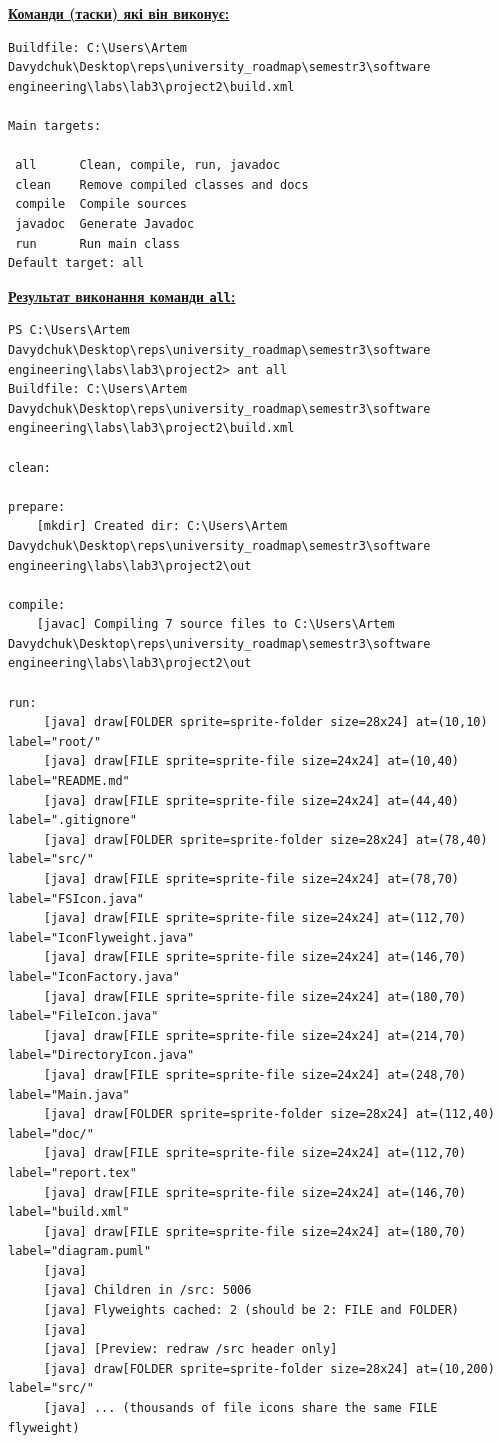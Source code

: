 \documentclass[12pt,a4paper]{article}
\begin{document}
    \newpage

    \textbf{\underline{Команди (таски) які він виконує:}}

    \begin{verbatim}
Buildfile: C:\Users\Artem Davydchuk\Desktop\reps\university_roadmap\semestr3\software engineering\labs\lab3\project2\build.xml

Main targets:

 all      Clean, compile, run, javadoc
 clean    Remove compiled classes and docs
 compile  Compile sources
 javadoc  Generate Javadoc
 run      Run main class
Default target: all
    \end{verbatim}

    \textbf{\underline{Результат виконання команди \texttt{all}:}}

    \begin{verbatim}
PS C:\Users\Artem Davydchuk\Desktop\reps\university_roadmap\semestr3\software engineering\labs\lab3\project2> ant all 
Buildfile: C:\Users\Artem Davydchuk\Desktop\reps\university_roadmap\semestr3\software engineering\labs\lab3\project2\build.xml

clean:

prepare:
    [mkdir] Created dir: C:\Users\Artem Davydchuk\Desktop\reps\university_roadmap\semestr3\software engineering\labs\lab3\project2\out

compile:
    [javac] Compiling 7 source files to C:\Users\Artem Davydchuk\Desktop\reps\university_roadmap\semestr3\software engineering\labs\lab3\project2\out

run:
     [java] draw[FOLDER sprite=sprite-folder size=28x24] at=(10,10) label="root/"
     [java] draw[FILE sprite=sprite-file size=24x24] at=(10,40) label="README.md"
     [java] draw[FILE sprite=sprite-file size=24x24] at=(44,40) label=".gitignore"
     [java] draw[FOLDER sprite=sprite-folder size=28x24] at=(78,40) label="src/"
     [java] draw[FILE sprite=sprite-file size=24x24] at=(78,70) label="FSIcon.java"
     [java] draw[FILE sprite=sprite-file size=24x24] at=(112,70) label="IconFlyweight.java"
     [java] draw[FILE sprite=sprite-file size=24x24] at=(146,70) label="IconFactory.java"
     [java] draw[FILE sprite=sprite-file size=24x24] at=(180,70) label="FileIcon.java"
     [java] draw[FILE sprite=sprite-file size=24x24] at=(214,70) label="DirectoryIcon.java"
     [java] draw[FILE sprite=sprite-file size=24x24] at=(248,70) label="Main.java"
     [java] draw[FOLDER sprite=sprite-folder size=28x24] at=(112,40) label="doc/"
     [java] draw[FILE sprite=sprite-file size=24x24] at=(112,70) label="report.tex"
     [java] draw[FILE sprite=sprite-file size=24x24] at=(146,70) label="build.xml"
     [java] draw[FILE sprite=sprite-file size=24x24] at=(180,70) label="diagram.puml"
     [java]
     [java] Children in /src: 5006
     [java] Flyweights cached: 2 (should be 2: FILE and FOLDER)
     [java]
     [java] [Preview: redraw /src header only]
     [java] draw[FOLDER sprite=sprite-folder size=28x24] at=(10,200) label="src/"
     [java] ... (thousands of file icons share the same FILE flyweight)


\end{verbatim}
\end{document}
